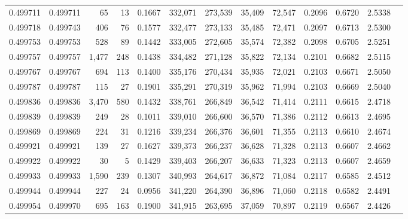 \begin{tabular}{rrrrrrrrrrrrr}
0.499711 & 0.499711 &    65 &    13 &                                     0.1667 & 332,071 & 273,539 &  35,409 &  72,547 & 0.2096 & 0.6720 & 2.5338 \\
0.499718 & 0.499743 &   406 &    76 &                                     0.1577 & 332,477 & 273,133 &  35,485 &  72,471 & 0.2097 & 0.6713 & 2.5300 \\
0.499753 & 0.499753 &   528 &    89 &                                     0.1442 & 333,005 & 272,605 &  35,574 &  72,382 & 0.2098 & 0.6705 & 2.5251 \\
0.499757 & 0.499757 & 1,477 &   248 &                                     0.1438 & 334,482 & 271,128 &  35,822 &  72,134 & 0.2101 & 0.6682 & 2.5115 \\
0.499767 & 0.499767 &   694 &   113 &                                     0.1400 & 335,176 & 270,434 &  35,935 &  72,021 & 0.2103 & 0.6671 & 2.5050 \\
0.499787 & 0.499787 &   115 &    27 &                                     0.1901 & 335,291 & 270,319 &  35,962 &  71,994 & 0.2103 & 0.6669 & 2.5040 \\
0.499836 & 0.499836 & 3,470 &   580 &                                     0.1432 & 338,761 & 266,849 &  36,542 &  71,414 & 0.2111 & 0.6615 & 2.4718 \\
0.499839 & 0.499839 &   249 &    28 &                                     0.1011 & 339,010 & 266,600 &  36,570 &  71,386 & 0.2112 & 0.6613 & 2.4695 \\
0.499869 & 0.499869 &   224 &    31 &                                     0.1216 & 339,234 & 266,376 &  36,601 &  71,355 & 0.2113 & 0.6610 & 2.4674 \\
0.499921 & 0.499921 &   139 &    27 &                                     0.1627 & 339,373 & 266,237 &  36,628 &  71,328 & 0.2113 & 0.6607 & 2.4662 \\
0.499922 & 0.499922 &    30 &     5 &                                     0.1429 & 339,403 & 266,207 &  36,633 &  71,323 & 0.2113 & 0.6607 & 2.4659 \\
0.499933 & 0.499933 & 1,590 &   239 &                                     0.1307 & 340,993 & 264,617 &  36,872 &  71,084 & 0.2117 & 0.6585 & 2.4512 \\
0.499944 & 0.499944 &   227 &    24 &                                     0.0956 & 341,220 & 264,390 &  36,896 &  71,060 & 0.2118 & 0.6582 & 2.4491 \\
0.499954 & 0.499970 &   695 &   163 &                                     0.1900 & 341,915 & 263,695 &  37,059 &  70,897 & 0.2119 & 0.6567 & 2.4426 \\

\end{tabular}
